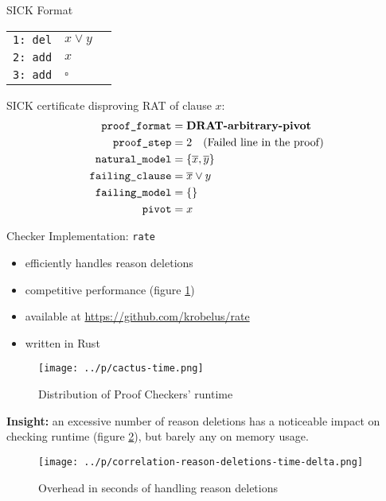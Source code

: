\documentclass[final,hyperref={pdfpagelabels=true}]{beamer}
\begin{document}
\begin{frame}[fragile]
\begin{columns}[t]
\begin{column}{.45\textwidth}
\begin{block}{SICK Format}
	\begin{tabular}{lll}
    		\texttt{1: del} & $x \lor y$		& \\
    		\texttt{2: add} & $x$			& \\
    		\texttt{3: add} & $\square$		& \\
	\end{tabular}

        \vspace{.5cm}
	SICK certificate disproving RAT of clause $x$:
        \begin{align*}
            \texttt{proof\_format}	&= \textbf{DRAT-arbitrary-pivot}		\\
	    \texttt{proof\_step}	&= 2 \text{\quad (Failed line in the proof)}	\\
	    \texttt{natural\_model}	&= \{\overline{x}, \overline{y}\}		\\
	    \texttt{failing\_clause}	&= \overline{x} \lor y				\\
	    \texttt{failing\_model}	&= \{\}						\\
	    \texttt{pivot}		&= x						\\
        \end{align*}
    \end{block}
    \begin{block}{Checker Implementation: \texttt{rate}}
        \begin{itemize}
            \item efficiently handles reason deletions
            \item competitive performance (figure \ref{fig:cactus-time})
            \item available at \url{https://github.com/krobelus/rate}
            \item written in Rust
        \end{itemize}
    \end{block}

    \begin{figure}
        \centering
        \caption{Distribution of Proof Checkers' runtime\label{fig:cactus-time}}
        \texttt{[image: ../p/cactus-time.png]}
    \end{figure}

    \textbf{Insight:} an excessive number of reason deletions
    has a noticeable impact on checking runtime (figure
    \ref{fig:correlation-reason-deletions-time-delta}), but barely any on
    memory usage.
    \vspace{1cm}

    \begin{figure}
        \centering
        \caption{Overhead in seconds of handling reason deletions\label{fig:correlation-reason-deletions-time-delta}}
        \texttt{[image: ../p/correlation-reason-deletions-time-delta.png]}
    \end{figure}

    \end{column}
  \end{columns}
\end{frame}
\end{document}
